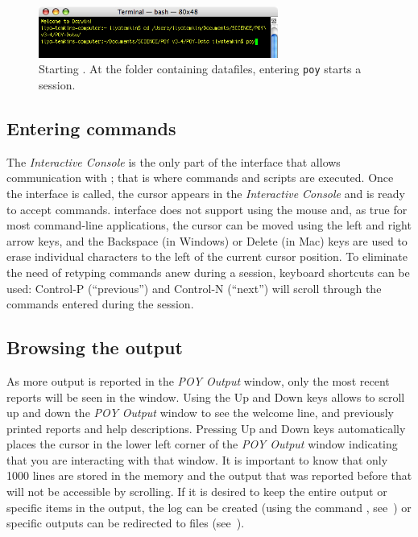 \begin{figure}[htbp]
   \centering
   \includegraphics[width=0.7\textwidth]{figures/figprelim2.jpg}
   \caption{Starting \poy. At the folder containing datafiles, entering \texttt{poy} starts a \poy session.}
   \label{fig:figprelim2}
\end{figure}

\subsection{Entering commands}
The \emph{Interactive Console} is the only part of the interface that allows communication with \poy; that is where commands and scripts are executed. Once the \poy interface is called, the cursor appears in the \emph{Interactive Console} and \poy is ready to accept commands. \poy interface does not support using the mouse and, as true for most command-line applications, the cursor can be moved using the left and right arrow keys, and the Backspace (in Windows) or Delete (in Mac) keys are used to erase individual characters to the left of the current cursor position. To eliminate the need of retyping commands anew during a \poy session, keyboard shortcuts can be used: Control-P (``previous'') and Control-N (``next'') will scroll through the commands entered during the session.

\subsection{Browsing the output}
As more output is reported in the \emph{POY Output} window, only the most recent reports will be seen in the window. Using the Up and Down keys allows to scroll up and down the \emph{POY Output} window to see the welcome line, and previously printed reports and help descriptions. Pressing Up and Down keys automatically places the cursor in the lower left corner of the \emph{POY Output} window indicating that you are interacting with that window. It is important to know that only 1000 lines are stored in the memory and the output that was reported before that will not be accessible by scrolling. If it is desired to keep the entire output or specific items in the output, the log can be created (using the command , see~) or specific outputs can be redirected to files (see~).

